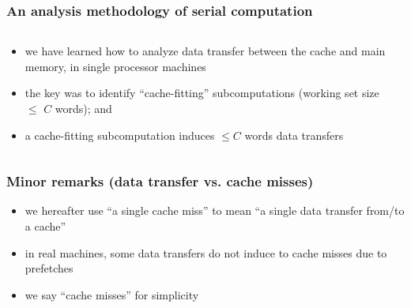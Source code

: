 \documentclass[12pt,dvipdfmx]{beamer}
\begin{document}
\begin{frame}
\frametitle{An analysis methodology of serial computation}
\begin{columns}
\begin{column}{0.6\textwidth}
\begin{itemize}
\item<1-> we have learned how to analyze data transfer
  between the cache and main memory, in single
  processor machines
\item<2-> the key was to identify ``cache-fitting'' subcomputations
  (working set size $\leq$ $C$ words); and
\item<3-> a cache-fitting subcomputation 
  induces $\leq C$ words data transfers
\end{itemize}
\end{column}

\begin{column}{0.4\textwidth}
\def\svgwidth{\textwidth}
{\scriptsize}

\vskip1cm

\def\svgwidth{\textwidth}
{\scriptsize}
\end{column}
\end{columns}
\end{frame}

\begin{frame}
\frametitle{Minor remarks (data transfer vs. cache misses)}
\begin{itemize}
\item we hereafter use ``a single cache miss'' to mean
  ``a single data transfer from/to a cache''
\item in real machines, some data transfers do not induce
  to cache misses due to prefetches
\item we say ``cache misses'' for simplicity
\end{itemize}

\end{frame}
\end{document}

